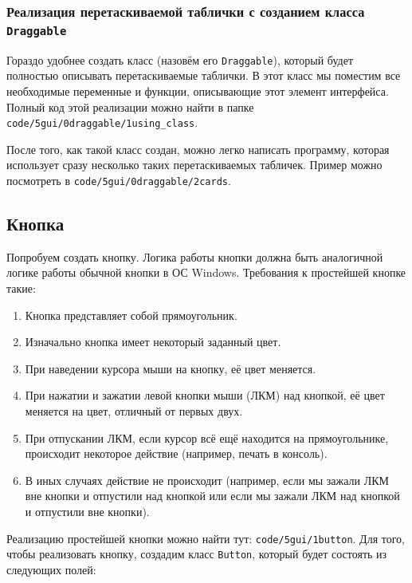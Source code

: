 \documentclass{article}
\begin{document}
\subsubsection*{Реализация перетаскиваемой таблички с созданием класса \texttt{Draggable}}
Гораздо удобнее создать класс (назовём его \texttt{Draggable}), который будет полностью описывать перетаскиваемые таблички. В этот класс мы поместим все необходимые переменные и функции, описывающие этот элемент интерфейса. Полный код этой реализации можно найти в папке \texttt{code/5gui/0draggable/1using\_class}.

После того, как такой класс создан, можно легко написать программу, которая использует сразу несколько таких перетаскиваемых табличек. Пример можно посмотреть в  \texttt{code/5gui/0draggable/2cards}.

\newpage
\subsection*{Кнопка}
Попробуем создать кнопку. Логика работы кнопки должна быть аналогичной логике работы обычной кнопки в ОС Windows. Требования к простейшей кнопке такие:
\begin{enumerate}
\item Кнопка представляет собой прямоугольник.
\item Изначально кнопка имеет некоторый заданный цвет.
\item При наведении курсора мыши на кнопку, её цвет меняется.
\item При нажатии и зажатии левой кнопки мыши (ЛКМ) над кнопкой, её цвет меняется на цвет, отличный от первых двух.
\item При отпускании ЛКМ, если курсор всё ещё находится на прямоугольнике, происходит некоторое действие (например, печать в консоль).
\item В иных случаях действие не происходит (например, если мы зажали ЛКМ вне кнопки и отпустили над кнопкой или если мы зажали ЛКМ над кнопкой и отпустили вне кнопки).
\end{enumerate}
Реализацию простейшей кнопки можно найти тут: \texttt{code/5gui/1button}.
Для того, чтобы реализовать кнопку, создадим класс \texttt{Button}, который будет состоять из следующих полей:
\end{document}
